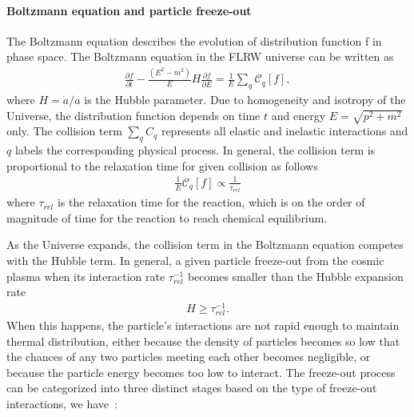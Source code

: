 \paragraph{Boltzmann equation and particle freeze-out}
The Boltzmann equation describes the evolution of distribution function f in phase space. The Boltzmann equation in the FLRW universe can be written as
\begin{align}
\frac{\partial f}{\partial t}-\frac{\left(E^2-m^2\right)}{E}H\frac{\partial f}{\partial E}=\frac{1}{E}\sum_{q}\mathcal{C}_q[f],
\end{align}
where $H=\dot{a}/a$ is the Hubble parameter. Due to homogeneity and isotropy of the Universe, the distribution function depends on time $t$ and energy $E=\sqrt{p^2+m^2}$ only. The collision term $\sum_qC_q$ represents all elastic and inelastic interactions and $q$ labels the corresponding physical process. In general, the collision term is proportional to the relaxation time for given collision as follows \cite{Anderson:1974nyl}
\begin{align}
\frac{1}{E}\mathcal{C}_q[f]\propto\frac{1}{\tau_{rel}}
\end{align}
where $\tau_{rel}$ is the relaxation time for the reaction, which is on the order of magnitude of time for the reaction to reach chemical equilibrium. 


As the Universe expands, the collision term in the Boltzmann equation competes with the Hubble term. In general, a given particle freeze-out from the cosmic plasma when its interaction rate $\tau_{rel}^{-1}$ becomes smaller than the Hubble expansion rate
\begin{align}
H\geqslant\tau_{rel}^{-1}.
\end{align}
When this happens, the particle's interactions are not rapid enough to maintain thermal distribution, either because the density of particles becomes so low that the chances of any two particles meeting each other becomes negligible, or because the particle energy becomes too low to interact. The freeze-out process can be categorized into three distinct stages based on the type of freeze-out interactions, we have~\cite{Birrell:2012gg,Rafelski:2023emw}:

